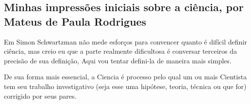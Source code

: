\subsection{Minhas impressões iniciais sobre a ciência, por Mateus de Paula Rodrigues}

Em \citep{schwartzman_ciencia_1984} Simon Schwartzman não mede esforços para convencer quanto é difícil definir ciência, mas creio eu que a parte realmente dificultosa é conversar terceiros da precisão de sua definição, Aqui vou tentar defini-la de maneira mais simples.

De sua forma mais essencial, a \gls{Ciencia} é processo pelo qual um ou mais \gls{Cientista} tem seu trabalho investigativo (seja esse uma hipótese, teoria, técnica ou que for) corrigido por seus pares.